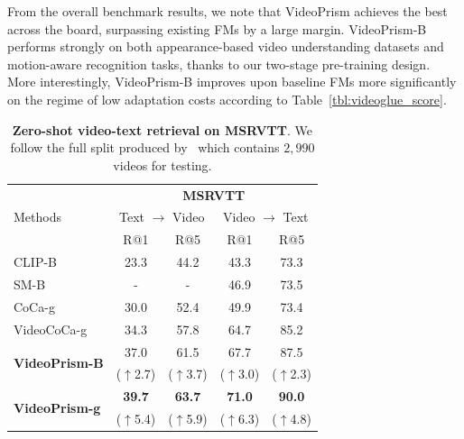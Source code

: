 \documentclass{article}
\theoremstyle{plain}
\theoremstyle{definition}
\theoremstyle{remark}
\newcommand{\OURS}{VideoPrism\xspace}
\newcommand{\upcolor}[1]{\textcolor{vpblue}{($\uparrow$#1)}}
\begin{document}
From the overall benchmark results, we note that \OURS achieves the best across the board, surpassing existing FMs by a large margin. 
\OURS-B performs strongly on both appearance-based video understanding datasets and motion-aware recognition tasks, thanks to our two-stage pre-training design.
More interestingly, \OURS-B improves upon baseline FMs more significantly on the regime of low adaptation costs according to Table~\ref{tbl:videoglue_score}. 
%
 \begin{table}[t]
\caption{\textbf{Zero-shot video-text retrieval on MSRVTT}. We follow the full split produced by~\citet{xu2016msr} which contains $2,990$ videos for testing.}
\label{tbl:msrvtt_zs}
\begin{center}
\begin{scriptsize}
\begin{tabular}{l|cccc}
    \toprule
    \multirow{3}{*}{Methods} & \multicolumn{4}{c}{\textbf{MSRVTT}} \\
    & \multicolumn{2}{c}{Text $\rightarrow$ Video} & \multicolumn{2}{c}{Video $\rightarrow$ Text} \\
    & R@1 & R@5 & R@1 & R@5 \\
    \midrule
    CLIP-B~\cite{radford2021learning} & 23.3 & 44.2 & 43.3 & 73.3 \\
    SM-B~\cite{zeng2022socratic} & - & - & 46.9 & 73.5 \\
    CoCa-g~\cite{yu2022coca} & 30.0 & 52.4 & 49.9 & 73.4 \\
    VideoCoCa-g~\cite{yan2022videococa} & 34.3 & 57.8 & 64.7 & 85.2 \\
    \midrule
    \multirow{2}{*}{\textbf{\OURS-B}} & 37.0 & 61.5 & 67.7 & 87.5 \\
    & \upcolor{2.7} & \upcolor{3.7} & \upcolor{3.0} & \upcolor{2.3} \\
    \hline
    \multirow{2}{*}{\textbf{\OURS-g}} & \textbf{39.7} & \textbf{63.7} & \textbf{71.0} & \textbf{90.0} \\
    & \upcolor{5.4} & \upcolor{5.9} & \upcolor{6.3} & \upcolor{4.8} \\
    \bottomrule
\end{tabular}
\end{scriptsize}
\end{center}
\vskip -0.1in
\end{table}
\end{document}
